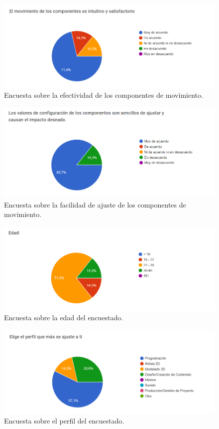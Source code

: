 \begin{figure}[H]
  \centering
  \includegraphics[width=450px,clip=true]{CUESTIONARIO_29.png}
  \caption{Encuesta sobre la efectividad de los componentes de movimiento.}
  \label{fig:CUESTIONARIO_29}
\end{figure}
\raggedbottom

\begin{figure}[H]
  \centering
  \includegraphics[width=450px,clip=true]{CUESTIONARIO_30.png}
  \caption{Encuesta sobre la facilidad de ajuste de los componentes de movimiento.}
  \label{fig:CUESTIONARIO_30}
\end{figure}
\raggedbottom

\begin{figure}[H]
  \centering
  \includegraphics[width=450px,clip=true]{CUESTIONARIO_31.png}
  \caption{Encuesta sobre la edad del encuestado.}
  \label{fig:CUESTIONARIO_31}
\end{figure}
\raggedbottom

\begin{figure}[H]
  \centering
  \includegraphics[width=450px,clip=true]{CUESTIONARIO_32.png}
  \caption{Encuesta sobre el perfil del encuestado.}
  \label{fig:CUESTIONARIO_32}
\end{figure}
\raggedbottom

